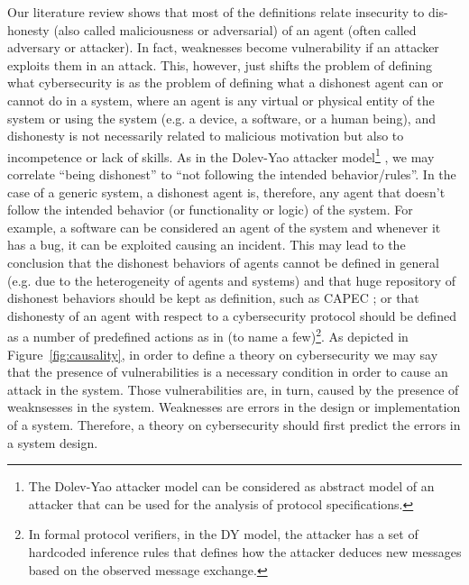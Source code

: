 \documentclass[conference]{IEEEtran}
\begin{document}
Our literature review shows that most of the definitions relate insecurity to
dis-honesty (also called maliciousness or adversarial) of an agent (often
called adversary or attacker). In fact, weaknesses become vulnerability if an
attacker exploits them in an attack.  This, however, just shifts the problem of
defining what cybersecurity is as the problem of defining what a dishonest
agent can or cannot do in a system, where an agent is any virtual or physical
entity of the system or using the system (e.g. a device, a software, or a human
being), and dishonesty is not necessarily related to malicious motivation but
also to incompetence or lack of skills. As in the Dolev-Yao attacker model\footnote{The Dolev-Yao
attacker model can be considered as abstract model of an attacker that can be
used for the analysis of protocol specifications.} \autocite{Dolev1983security}, we may
correlate ``being dishonest'' to ``not following the intended behavior/rules''.
In the case of a generic system, a dishonest agent is, therefore, any agent
that doesn't follow the intended behavior (or functionality or logic) of the
system.  For example, a software can be considered an agent of the system and
whenever it has a bug, it can be exploited causing an incident. This
may lead to the conclusion that the dishonest behaviors of agents cannot be
defined in general (e.g. due to the heterogeneity of agents and systems) and
that huge repository of dishonest behaviors should be kept as definition, such
as CAPEC \autocite{MITRE2020CAPEC}; or that dishonesty of an agent with respect
to a cybersecurity protocol should be defined as a number of predefined actions as
in
\autocite{Turuani2006clatse,Basin2005ofmc,Armando2016satmc,Rocchetto2017interpolation}
(to name a few)\footnote{In formal protocol verifiers, in the DY model, the
attacker has a set of hardcoded inference rules that defines how the attacker
deduces new messages based on the observed message exchange.}.  As depicted in
Figure~\ref{fig:causality}, in order to define a theory on cybersecurity we may
say that the presence of vulnerabilities is a necessary condition in order to
cause an attack in the system.  Those vulnerabilities are, in turn, caused by
the presence of weaknsesses in the system.  Weaknesses are errors in the design
or implementation of a system.  Therefore, a theory on cybersecurity should
first predict the errors in a system design.
\end{document}
